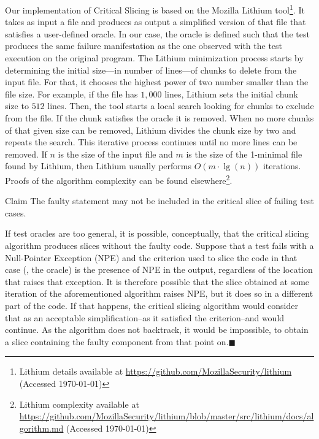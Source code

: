 \documentclass{article}
\begin{document}
Our implementation of Critical Slicing is based on the Mozilla Lithium
tool\footnote{Lithium details available at {\footnotesize\url{https://github.com/MozillaSecurity/lithium}} (Accessed \today)}. It takes as input a file
and produces as output a simplified version of that file that
satisfies a user-defined oracle. In our case, the oracle is defined
such that the test produces the same failure manifestation as the one
observed with the test execution on the original program. The
Lithium minimization process starts by determining the initial size---in
number of lines---of chunks to delete from the input file. For that,
it chooses the highest power of two number smaller than the file
size. For example, if the file has $1,000$ lines, Lithium sets the
initial chunk size to $512$ lines. Then, the tool starts a local search looking
for chunks to exclude from the file. If the chunk satisfies the oracle it is removed.
When no more chunks of that given size can be removed, Lithium
divides the chunk size by two and repeats the search. This iterative
process continues until no more lines can be removed.  If $n$ is the
size of the input file and $m$ is the size of the 1-minimal file found
by Lithium, then Lithium usually performs $O(m\cdot\lg(n))$
iterations. Proofs of the algorithm complexity can be found
elsewhere\footnote{Lithium complexity available at \url{https://github.com/MozillaSecurity/lithium/blob/master/src/lithium/docs/algorithm.md} 
(Accessed \today)}.

\begin{namedthm}{Claim}\label{claim:1}
  The faulty statement may not be included in the critical slice of
  failing test cases.
\end{namedthm}

If test oracles are too general, it is possible, conceptually, that
the critical slicing algorithm produces slices without the faulty
code. Suppose that a test fails with a Null-Pointer Exception (NPE)
and the criterion used to slice the code in that case (\ie{}, the
oracle) is the presence of NPE in the output, regardless of the
location that raises that exception. It is therefore possible that the
slice obtained at some iteration of the aforementioned algorithm
raises NPE, but it does so in a different part of the code. If that
happens, the critical slicing algorithm would consider that as an
acceptable simplification--as it satisfied the criterion--and would
continue. As the algorithm does not backtrack, it would be impossible,
to obtain a slice containing the faulty component from that point
on.\hfill{\tiny$\blacksquare$}
\end{document}
